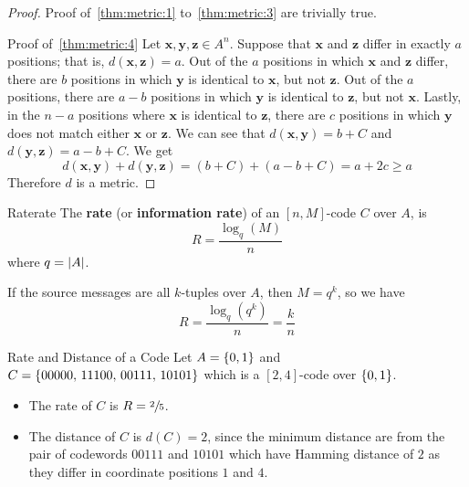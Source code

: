 \begin{proof}

    Proof of~\ref{thm:metric:1} to~\ref{thm:metric:3} are trivially true.

    Proof of~\ref{thm:metric:4} Let $ \bm{x},\bm{y},\bm{z}\in A^n $. Suppose that $ \bm{x} $
    and $ \bm{z} $ differ in exactly $ a $ positions; that is, $ d(\bm{x},\bm{z})=a $.
    Out of the $ a $ positions in which $ \bm{x} $ and $ \bm{z} $ differ,
    there are $ b $ positions in which $ \bm{y} $ is identical to
    $ \bm{x} $, but not $ \bm{z} $. Out of the $ a $ positions,
    there are $ a-b $ positions in which $ \bm{y} $ is identical to
    $ \bm{z} $, but not $ \bm{x} $. Lastly, in the $ n-a $ positions
    where $ \bm{x} $ is identical to $ \bm{z} $, there are $ c $
    positions in which $ \bm{y} $ does not match either
    $ \bm{x} $ or $ \bm{z} $. We can see that
    $ d(\bm{x},\bm{y})=b+C $ and $ d(\bm{y},\bm{z})=a-b+C $. We get
    \[ d(\bm{x},\bm{y})+d(\bm{y},\bm{z})=(b+C) + (a-b+C)=a+2c\geqslant a \]
    Therefore $ d $ is a metric.
\end{proof}

\begin{Definition}{Rate}{rate}
    The \textbf{rate} (or \textbf{information rate}) of an $ [n,M] $-code $ C $ over
    $ A $, is
    \[ R=\frac{\log_q(M)}{n} \]
    where $ q=\lvert A\rvert $.

    If the source messages are all $ k $-tuples over $ A $, then $ M=q^k $, so we have
    \[ R=\frac{\log_q(q^k)}{n}=\frac{k}{n}  \]
\end{Definition}

\begin{Example}{Rate and Distance of a Code}{}
    Let $ A=\{0,1\} $ and $ C=\{00000,\,11100,\,00111,\,10101\} $ which is a
    $ [2,4] $-code over $ \{0,1\} $.
    \begin{itemize}
        \item The rate of $ C $ is $ R=\sfrac{2}{5} $.
        \item The distance of $ C $ is $ d(C)=2 $, since the minimum distance
              are from the pair of codewords $ 00111 $ and $ 10101 $ which
              have Hamming distance of $ 2 $ as they differ in coordinate
              positions $ 1 $ and $ 4 $.
    \end{itemize}
\end{Example}
